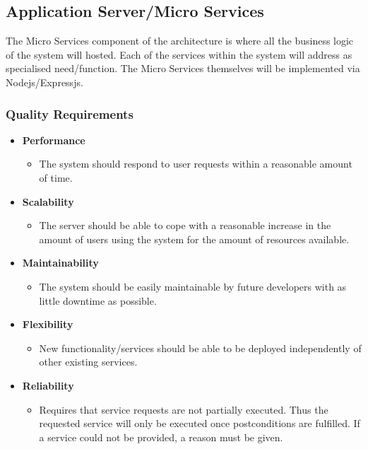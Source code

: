 \documentclass[a4paper,12pt]{article}
\begin{document}
	\newpage
	\subsection{Application Server/Micro Services}
	The Micro Services component of the architecture is where all the business logic of the system will hosted. Each of the services within the system will address as specialised need/function. The Micro Services themselves will be implemented via Nodejs/Expressjs.
	
	\subsubsection{Quality Requirements}
	\begin{itemize}
		\item\textbf{Performance}
		\begin{itemize}
			\item The system should respond to user requests within a reasonable amount of time.
		\end{itemize}
		
		\item\textbf{Scalability}
		\begin{itemize}
			\item The server should be able to cope with a reasonable increase in the amount of users using the system for the amount of resources available. 
		\end{itemize}
		
		\item\textbf{Maintainability}
		\begin{itemize}
			\item The system should be easily maintainable by future developers with as little downtime as possible. 
		\end{itemize}
		
		\item\textbf{Flexibility}
		\begin{itemize}
			\item New functionality/services should be able to be deployed independently of other existing services.
		\end{itemize}
		
		\item\textbf{Reliability}
		\begin{itemize}
			\item Requires that service requests are not partially executed. Thus the requested service will only be executed once postconditions are fulfilled. If a service could not be provided, a reason must be given.
		\end{itemize}
		

\end{itemize}
\end{document}

